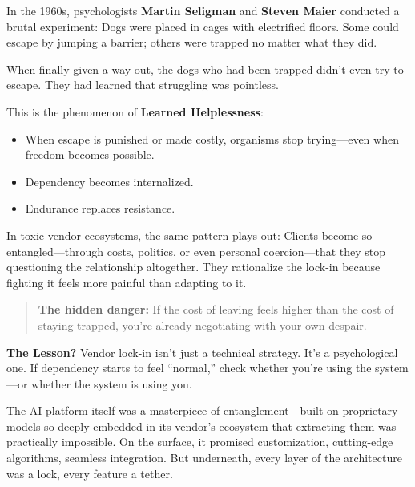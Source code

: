\begin{tcolorbox}[colback=blue!5!white, colframe=blue!50!black, breakable,
  title={Psychological Sidebar: Learned Helplessness — When Escape Costs More Than Staying}]

In the 1960s, psychologists \textbf{Martin Seligman} and \textbf{Steven Maier} conducted a brutal experiment:  
Dogs were placed in cages with electrified floors.  
Some could escape by jumping a barrier; others were trapped no matter what they did.

\medskip

When finally given a way out, the dogs who had been trapped didn’t even try to escape.  
They had learned that struggling was pointless.

\medskip

This is the phenomenon of \textbf{Learned Helplessness}:
\begin{itemize}
    \item When escape is punished or made costly, organisms stop trying—even when freedom becomes possible.
    \item Dependency becomes internalized.
    \item Endurance replaces resistance.
\end{itemize}

\medskip

In toxic vendor ecosystems, the same pattern plays out:  
Clients become so entangled—through costs, politics, or even personal coercion—that they stop questioning the relationship altogether.  
They rationalize the lock-in because fighting it feels more painful than adapting to it.

\medskip

\begin{quote}
\textbf{The hidden danger:} If the cost of leaving feels higher than the cost of staying trapped, you're already negotiating with your own despair.
\end{quote}

\medskip

\textbf{The Lesson?} Vendor lock-in isn’t just a technical strategy. It’s a psychological one. If dependency starts to feel “normal,” check whether you’re using the system—or whether the system is using you.
\end{tcolorbox}


The AI platform itself was a masterpiece of entanglement—built on proprietary models so deeply embedded in its vendor’s ecosystem that extracting them was practically impossible. On the surface, it promised customization, cutting-edge algorithms, seamless integration. But underneath, every layer of the architecture was a lock, every feature a tether.

